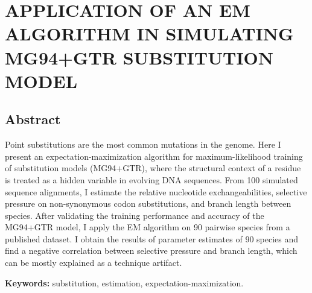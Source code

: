 \chapter{\normalfont APPLICATION OF AN EM ALGORITHM IN SIMULATING MG94+GTR SUBSTITUTION MODEL}
\label{ch:phyloEM}





\section{Abstract}
Point substitutions are the most common mutations in the genome. Here I present an expectation-maximization algorithm for maximum-likelihood training of substitution models (MG94+GTR), where the structural context of a residue is treated as a hidden variable
in evolving DNA sequences. From 100 simulated sequence alignments, I estimate the relative nucleotide exchangeabilities, selective pressure on non-synonymous codon substitutions, and branch length between species. After validating the training performance and accuracy of the MG94+GTR model, I apply the EM algorithm on 90 pairwise species from a published dataset. I obtain the results of parameter estimates of 90 species and find a negative correlation between selective pressure and branch length, which can be mostly explained as a technique artifact. 

\noindent\textbf{Keywords:} substitution, estimation, expectation-maximization. 


